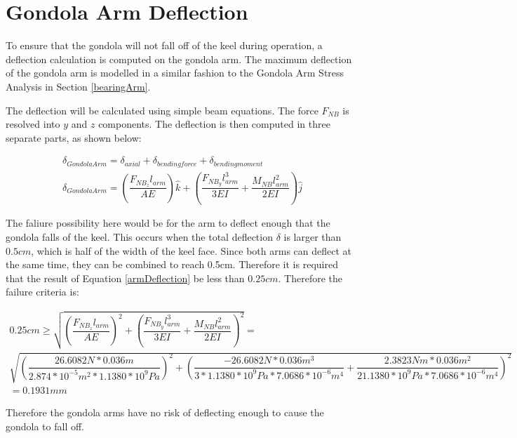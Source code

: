 \documentclass[../main.tex]{subfiles}
\begin{document}
\section{Gondola Arm Deflection} \label{gondDeflection}
To ensure that the gondola will not fall off of the keel during operation, a deflection calculation is computed on the gondola arm. The maximum deflection of the gondola arm is modelled in a similar fashion to the Gondola Arm Stress Analysis in Section \ref{bearingArm}.

The deflection will be calculated using simple beam equations. The force $F_{NB}$ is resolved into $y$ and $z$ components. The deflection is then computed in three separate parts, as shown below:

\begin{align}
	\delta _{Gondola Arm} = \delta _{axial} + \delta _{bending force} + \delta _{bending moment} \\ \label{armDeflection}
	\delta _{Gondola Arm}  = \left(\dfrac{F_{NB_{z}}l_{arm}}{AE}\right)\hat{k} + \left(\dfrac{F_{NB_{y}}l_{arm}^3}{3EI}  + \dfrac{M_{NB}l_{arm}^2}{2EI} \right) \hat{j}
\end{align}

The faliure possibility here would be for the arm to deflect enough that the gondola falls of the keel. This occurs when the total deflection $\delta$ is larger than $0.5cm$, which is half of the width of the keel face. Since both arms can deflect at the same time, they can be combined to reach 0.5cm. Therefore it is required that the result of Equation \ref{armDeflection} be less than $0.25cm$. Therefore the failure criteria is:

\begin{multline}
	0.25cm \geq \sqrt{\left(\dfrac{F_{NB_{z}}l_{arm}}{AE}\right)^2 + \left(\dfrac{F_{NB_{y}}l_{arm}^3}{3EI}  + \dfrac{M_{NB}l_{arm}^2}{2EI} \right)^2} =\\ \sqrt{\left(\dfrac{26.6082N*0.036m}{2.874*10^{-5}m^2*1.1380*10^9Pa}\right)^2 + \left(\dfrac{-26.6082N*0.036m^3}{3*1.1380*10^9Pa*7.0686*10^{-6}m^4}  + \dfrac{2.3823Nm*0.036m^2}{21.1380*10^9Pa*7.0686*10^{-6}m^4} \right)^2}\\=0.1931mm
\end{multline}

Therefore the gondola arms have no risk of deflecting enough to cause the gondola to fall off.
\end{document}
